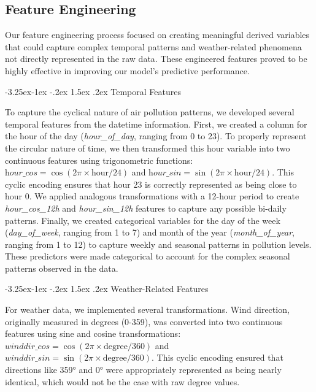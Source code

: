 \documentclass[twoside,11pt]{article}
\makeatletter
\renewcommand\subsubsection{\@startsection{subsubsection}{3}{\z@}%
  {-3.25ex\@plus -1ex \@minus -.2ex}%
  {1.5ex \@plus .2ex}%
  {\normalfont\bfseries\normalsize}}
\makeatother
\begin{document}
\subsection{Feature Engineering}

Our feature engineering process focused on creating meaningful derived variables that could capture complex temporal patterns and weather-related phenomena not directly represented in the raw data. These engineered features proved to be highly effective in improving our model's predictive performance.

\subsubsection{Temporal Features}

To capture the cyclical nature of air pollution patterns, we developed several temporal features from the datetime information. First, we created a column for the hour of the day (\textit{hour\_of\_day}, ranging from 0 to 23). To properly represent the circular nature of time, we then transformed this hour variable into two continuous features using trigonometric functions: $\textit{hour\_cos} = \cos(2\pi \times \text{hour}/24)$ and $\textit{hour\_sin} = \sin(2\pi \times \text{hour}/24)$. This cyclic encoding ensures that hour 23 is correctly represented as being close to hour 0. We applied analogous transformations with a 12-hour period to create \textit{hour\_cos\_12h} and \textit{hour\_sin\_12h} features to capture any possible bi-daily patterns. Finally, we created categorical variables for the day of the week (\textit{day\_of\_week}, ranging from 1 to 7) and month of the year (\textit{month\_of\_year}, ranging from 1 to 12) to capture weekly and seasonal patterns in pollution levels. These predictors were made categorical to account for the complex seasonal patterns observed in the data.

\subsubsection{Weather-Related Features}

For weather data, we implemented several transformations. Wind direction, originally measured in degrees (0-359), was converted into two continuous features using sine and cosine transformations: $\textit{winddir\_cos} = \cos(2\pi \times \text{degree}/360)$ and $\textit{winddir\_sin} = \sin(2\pi \times \text{degree}/360)$. This cyclic encoding ensured that directions like 359° and 0° were appropriately represented as being nearly identical, which would not be the case with raw degree values.
\end{document}
